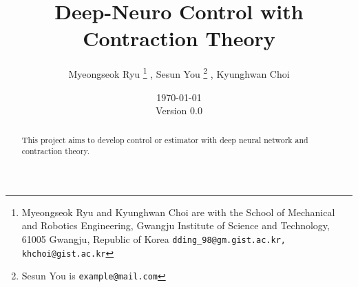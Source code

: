 \documentclass{article}
\title{
    Deep-Neuro Control with Contraction Theory
}
\author{
    Myeongseok Ryu
    \thanks{Myeongseok Ryu and Kyunghwan Choi are with the School of Mechanical and Robotics Engineering, Gwangju Institute of Science and Technology, 61005 Gwangju, Republic of Korea {\tt\small dding\_98@gm.gist.ac.kr, khchoi@gist.ac.kr}}%
    ,
    Sesun You
    \thanks{Sesun You is 
        {\tt\small example@mail.com}}%
    ,
    Kyunghwan Choi
    \footnotemark[1]
}
\date{
    \today
    \\
    Version 0.0
}
\newcommand*{\template}{../dding_template}
\begin{document}
\maketitle

\begin{abstract}
    This project aims to develop control or estimator with deep neural network and contraction theory.
\end{abstract}

\tableofcontents









\begin{appendices}
\end{appendices}




\end{document}
